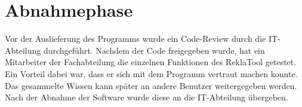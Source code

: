 \section{Abnahmephase} 
\label{sec:Abnahmephase}
Vor der Auslieferung des Programms wurde ein Code-Review durch die IT-Abteilung durchgeführt.
Nachdem der Code freigegeben wurde, hat ein Mitarbeiter der Fachabteilung die einzelnen
Funktionen des ReklaTool getestet. Ein Vorteil dabei war, dass er sich mit dem
Programm vertraut machen konnte. Das gesammelte Wissen kann später an andere Benutzer weitergegeben werden.
Nach der Abnahme der Software wurde diese an die IT-Abteilung übergeben.